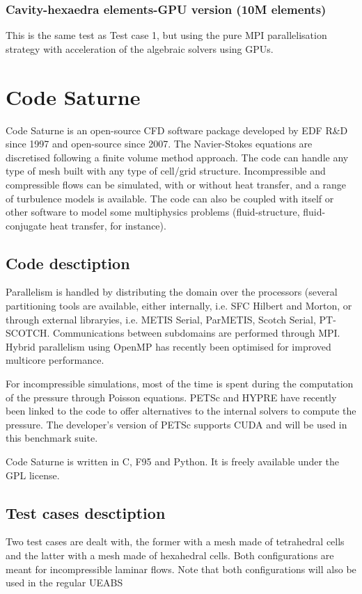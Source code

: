 \subsubsection{Cavity-hexaedra elements-GPU version (10M elements)}
This is the same test as Test case 1, but using the pure MPI parallelisation strategy with acceleration of the algebraic solvers using GPUs.

\section{Code Saturne}
Code Saturne is an open-source CFD software package developed by EDF R\&D since 1997 and open-source since 2007. The Navier-Stokes equations are discretised following a finite volume method approach. The code can handle any type of mesh built with any type of cell/grid structure. Incompressible and compressible flows can be simulated, with or without heat transfer, and a range of turbulence models is available. The code can also be coupled with itself or other software to model some multiphysics problems (fluid-structure, fluid-conjugate heat transfer, for instance).

\subsection{Code desctiption}
Parallelism is handled by distributing the domain over the processors (several partitioning tools are available, either internally, i.e. SFC Hilbert and Morton, or through external libraryies, i.e. METIS Serial, ParMETIS, Scotch Serial, PT-SCOTCH. Communications between subdomains are performed through MPI. Hybrid parallelism using OpenMP has recently been optimised for improved multicore performance.

For incompressible simulations, most of the time is spent during the computation of the pressure through Poisson equations. PETSc and HYPRE have recently been linked to the code to offer alternatives to the internal solvers to compute the pressure. The developer’s version of PETSc supports CUDA and will be used in this benchmark suite.

Code Saturne is written in C, F95 and Python. It is freely available under the GPL license.

\subsection{Test cases desctiption}
Two test cases are dealt with, the former with a mesh made of tetrahedral cells and the latter with a mesh made of hexahedral cells. Both configurations are meant for incompressible laminar flows. Note that both configurations will also be used in the regular UEABS

